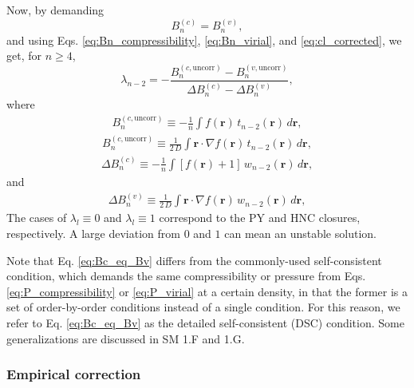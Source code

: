 \documentclass[aip,jcp,preprint,superscriptaddress,showpacs,preprintnumbers,amsmath,amssymb]{revtex4-1}
\newcommand{\vct}[1]{\mathbf{#1}}
\providecommand{\vr}{} %
\renewcommand{\vr}{\vct{r}}
\begin{document}
Now, by demanding
%
\begin{equation}
B_n^{(c)} = B_n^{(v)},
\label{eq:Bc_eq_Bv}
\end{equation}
%
and using Eqs. \eqref{eq:Bn_compressibility},
\eqref{eq:Bn_virial},
and
\eqref{eq:cl_corrected},
%
we get, for $n \ge 4$,
%
\begin{equation}
\lambda_{n-2}
=
-
\frac{
  B_n^{(c, \mathrm{uncorr})}
- B_n^{(v, \mathrm{uncorr})}
} {
  \Delta B_n^{(c)}
- \Delta B_n^{(v)}
},
\label{eq:lambda}
\end{equation}
%
where
%
\begin{align*}
B_n^{(c, \mathrm{uncorr})}
\equiv
-\frac{1}{n}
\int f(\vr) \, t_{n-2}(\vr) \, d\vr,
\end{align*}
%
\begin{align*}
B_n^{(c, \mathrm{uncorr})}
\equiv
\frac{1}{2 \, D}
\int \vr \cdot \nabla f(\vr) \, t_{n-2}(\vr) \, d\vr,
\end{align*}
%
\begin{align*}
\Delta B_n^{(c)}
\equiv
-\frac{1}{n}
\int [f(\vr) + 1] \, w_{n-2}(\vr) \, d\vr,
\end{align*}
%
and
%
\begin{align*}
\Delta B_n^{(v)}
\equiv
\frac{1}{2 \, D}
\int \vr \cdot \nabla f(\vr) \, w_{n-2}(\vr) \, d\vr,
\end{align*}
%
The cases of $\lambda_l \equiv 0$ and $\lambda_l \equiv 1$
correspond to the PY and HNC closures, respectively.
%
A large deviation from $0$ and $1$ can mean an unstable solution.



Note that Eq. \eqref{eq:Bc_eq_Bv}
differs from the commonly-used self-consistent condition\cite{
hurst1965, rowlinson1965, rowlinson1966,
lado1967, *henderson1970, *zerah1986,
hutchinson1971, hutchinson1972,
verlet1980,
hall1980,
martynov1983,
rogers1984,
ballone1986,
duh1995, *bomont2001, *choudhury2002,
marucho2007},
which demands the same compressibility or pressure from
Eqs. \eqref{eq:P_compressibility} or \eqref{eq:P_virial}
at a certain density,
in that the former is a set of order-by-order conditions
instead of a single condition.
%
For this reason,
we refer to Eq. \eqref{eq:Bc_eq_Bv}
as the detailed self-consistent (DSC) condition.
%
Some generalizations are discussed in SM 1.F and 1.G.




\subsubsection{Empirical correction}
\end{document}
